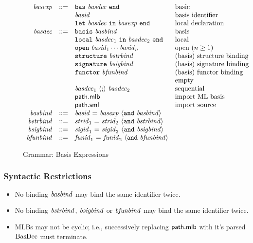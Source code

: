 \begin{figure}[h]
\begin{displaymath}
\begin{array}{rcll}
\mit{basexp} & ::= & 
\mtt{bas}~ \mit{basdec} ~\mtt{end} 
& \mbox{basic} \\&& 
\mit{basid} 
& \mbox{basis identifier} \\&&
\mtt{let}~ \mit{basdec} ~\mtt{in}~ \mit{basexp} ~\mtt{end} 
& \mbox{local declaration} \\

\mit{basdec} & ::= & 
\mtt{basis}~ \mit{basbind}
& \mbox{basis} \\&&
\mtt{local}~ \mit{basdec}_1 ~\mtt{in}~ \mit{basdec}_2 ~\mtt{end} 
& \mbox{local} \\&&
\mtt{open}~ \mit{basid}_1 \cdots \mit{basid}_n 
& \mbox{open ($n \geq 1$)} \\&&
\mtt{structure}~ \mit{bstrbind}
& \mbox{(basis) structure binding} \\&&
\mtt{signature}~ \mit{bsigbind}
& \mbox{(basis) signature binding} \\&&
\mtt{functor}~ \mit{bfunbind}
& \mbox{(basis) functor binding} \\&&
\quad
& \mbox{empty} \\&&
\mit{basdec}_1~\langle\mtt{;}\rangle~\mit{basdec}_2 
& \mbox{sequential} \\&&
\msf{path.mlb} &
\mbox{import ML basis} \\&&
\msf{path.sml} 
& \mbox{import source} \\

\mit{basbind} & ::= &  
\mit{basid} ~\mtt{=}~ \mit{basexp} ~\langle\mtt{and}~ \mit{basbind}\rangle \\
\mit{bstrbind} & ::= &  
\mit{strid}_1 ~\mtt{=}~ \mit{strid}_2 ~\langle\mtt{and}~ \mit{bstrbind}\rangle \\
\mit{bsigbind} & ::= &  
\mit{sigid}_1 ~\mtt{=}~ \mit{sigid}_2 ~\langle\mtt{and}~ \mit{bsigbind}\rangle \\
\mit{bfunbind} & ::= &  
\mit{funid}_1 ~\mtt{=}~ \mit{funid}_2 ~\langle\mtt{and}~ \mit{bfunbind}\rangle
\end{array}
\end{displaymath}
\caption{Grammar: Basis Expressions}\label{fig:mlb:S:GrammaticalRules}
\end{figure}

\subsubsection{Syntactic Restrictions}
\begin{itemize}
\item No binding $\mit{basbind}$ may bind the same identifier twice.
\item No binding $\mit{bstrbind}$, $\mit{bsigbind}$ or $\mit{bfunbind}$ may bind the same identifier twice.
\item MLBs may not be cyclic; i.e., successively replacing
  $\msf{path.mlb}$ with it's parsed $\mrm{BasDec}$ must terminate.
\end{itemize}


